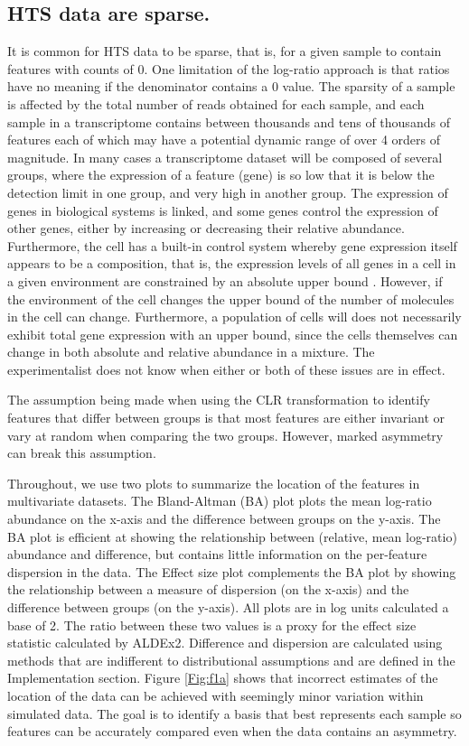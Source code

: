 \documentclass{bmcart}
\begin{document}
\subsection*{HTS data are sparse.}It is common for HTS data to be sparse, that is, for a given sample to contain features with counts of 0. One limitation of the log-ratio approach is that ratios have no meaning if the denominator contains a 0 value. The sparsity of a sample is affected by the total number of reads obtained for each sample, and each sample in a transcriptome contains between thousands and tens of thousands of features each of which may have a potential dynamic range of over 4 orders of magnitude. In many cases a transcriptome dataset will be composed of several groups, where the expression of a feature (gene) is so low that it is below the detection limit in one group, and very high in another group. The expression of genes in biological systems is linked, and some genes control the expression of other genes, either by increasing or decreasing their relative abundance. Furthermore, the cell has a built-in control system whereby gene expression itself appears to be a composition, that is, the expression levels of all genes in a cell in a given environment are constrained by an absolute upper bound  \cite{Scott:2010}. However, if the environment of the cell changes the upper bound of the number of molecules in the cell can change. Furthermore, a population of cells will does not necessarily exhibit total gene expression with an upper bound, since the cells themselves can change in both absolute and relative abundance in a mixture. The experimentalist does not know when either or both of these issues are in effect.

The assumption being made when using the CLR transformation to identify features that differ between groups is that most features are either invariant or vary at random when comparing the two groups. However, marked asymmetry can break this assumption.


Throughout, we use two plots to summarize the location of the features in multivariate datasets. The Bland-Altman (BA) plot  \cite{altman:1983} plots the mean log-ratio abundance on the x-axis and the difference between groups on the y-axis. The BA plot is efficient at showing the relationship between (relative, mean log-ratio) abundance and difference, but contains little information on the per-feature dispersion in the data. The Effect size plot \cite{Gloor:2015} complements the BA plot by showing the relationship between a measure of dispersion (on the x-axis) and the difference between groups (on the y-axis). All plots are in log units calculated a base of 2. The ratio between these two values is a proxy for the effect size statistic calculated by ALDEx2. Difference and dispersion are calculated using methods that are indifferent to distributional assumptions and are defined in the Implementation section. Figure \ref{Fig:f1a} shows that incorrect estimates of the location of the data can be achieved with seemingly minor variation within simulated data. The goal is to identify a basis that best represents each sample so features can be accurately compared even when the data contains an asymmetry.
\end{document}
